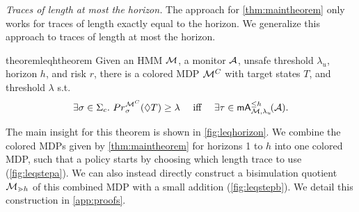 \documentclass[runningheads]{llncs}
\newcommand{\appcite}[2]{#2} %
\newcommand{\missedalarms}[2]{\mathsf{mA}_{#1}^{#2}}
\newcommand{\ccSched}{\Sigma_c}
\renewcommand{\paragraph}[1]{\smallskip\noindent\emph{#1}}
\begin{document}
\paragraph{Traces of length at most the horizon.}
The approach for \cref{thm:maintheorem} only works for traces of length exactly equal to the horizon. We generalize this approach to traces of length at most the horizon.
\begin{restatable}{theorem}{leqhtheorem}
    \label{thm:leqhtheorem}
    Given an HMM $\mathcal{M}$, a monitor $\mathcal{A}$, unsafe threshold $\lambda_u$, horizon $h$, and risk $r$, there is a colored MDP $\mathcal{M}^{C}$ with target states $T$, and threshold $\lambda$ s.t.\
    \[ \exists \sigma \in \ccSched.\ \Prob^{\mdpc}_{\sigma}(\lozenge T) \geq \lambda\quad\text{ iff }\quad \exists \tau\in \missedalarms{\mc,\lambda_u}{\leq h}\!(\dfa).\]
\end{restatable}
\noindent The main insight for this theorem is shown in \cref{fig:leqhorizon}. We combine the colored MDPs given by \cref{thm:maintheorem} for horizons 1 to $h$ into one colored MDP, such that a policy starts by choosing which length trace to use (\cref{fig:leqstepa}). We can also instead directly construct a bisimulation quotient  $\mathcal{M}_{\gtrdot h}$ of this combined MDP  with a small addition (\cref{fig:leqstepb}). We detail this construction in \appcite{\cite[App. A]{TR}}{\cref{app:proofs}}.
\end{document}

